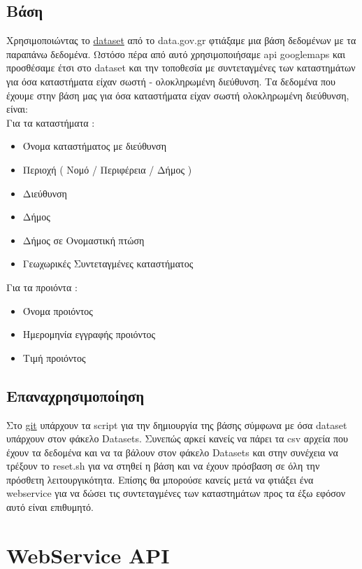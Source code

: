 \documentclass[a4paper,10pt]{report}
\begin{document}
\subsection{Βάση}
Χρησιμοποιώντας το \href{http://www.data.gov.gr/dataset/17/}{dataset} από το data.gov.gr 
φτιάξαμε μια βάση δεδομένων με τα παραπάνω δεδομένα. Ωστόσο πέρα από αυτό χρησιμοποιήσαμε
api googlemaps και προσθέσαμε έτσι στο dataset και την τοποθεσία με συντεταγμένες των 
καταστημάτων για όσα καταστήματα είχαν σωστή - ολοκληρωμένη διεύθυνση. 
Τα δεδομένα που έχουμε στην βάση μας για όσα καταστήματα είχαν σωστή 
ολοκληρωμένη διεύθυνση, είναι: \\
Για τα καταστήματα :
\begin{itemize}
 \item Όνομα καταστήματος με διεύθυνση
 \item Περιοχή ( Νομό / Περιφέρεια / Δήμος )
 \item Διεύθυνση 
 \item Δήμος 
 \item Δήμος σε Ονομαστική πτώση
 \item Γεωχωρικές Συντεταγμένες καταστήματος
\end{itemize}
Για τα προιόντα :
\begin{itemize}
 \item Όνομα προιόντος
 \item Ημερομηνία εγγραφής προιόντος 
 \item Τιμή προιόντος
\end{itemize}


\subsection{Επαναχρησιμοποίηση}
Στο \href{https://github.com/Pana-sonic/aginara/tree/master/Database}{git} υπάρχουν τα script 
για την δημιουργία της βάσης σύμφωνα με όσα dataset υπάρχουν στον φάκελο Datasets. Συνεπώς αρκεί
κανείς να πάρει τα csv αρχεία που έχουν τα δεδομένα και να τα βάλουν στον φάκελο Datasets και στην
συνέχεια να τρέξουν το reset.sh για να στηθεί η βάση και να έχουν πρόσβαση σε όλη την πρόσθετη
λειτουργικότητα. Επίσης θα μπορούσε κανείς μετά να φτιάξει ένα webservice για να δώσει τις 
συντεταγμένες των καταστημάτων προς τα έξω εφόσον αυτό είναι επιθυμητό.

\section{WebService API}
\end{document}
